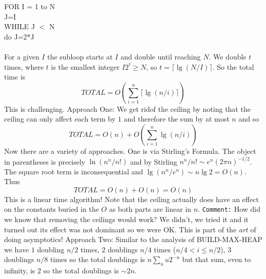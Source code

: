 \documentclass{article}
\begin{document}
\begin{enumerate}
\begin{enumerate}
{{    FOR I = 1 to N
    \\ \hspace*{1cm} J=I
    \\ \hspace*{1cm} WHILE J $<$ N
    \\ \hspace*{2cm} do J=2*J}}
        \\\\ For a given $I$ the subloop starts at $I$ 
		and double until reaching $N$.  We double $t$ times, where $t$ 
		is the smallest integer $I2^t\geq N$, so 
		$t=\lceil \lg(N/I) \rceil$. So the total time is
		\begin{equation}TOTAL = O\left( \sum_{i=1}^n \lceil\lg(n/i)\rceil \right)\end{equation}
		This is challenging.  
		\newline Approach One: We get ridof the ceiling by noting that 
		the ceiling can only affect each term by $1$ and therefore 
		the sum by at most $n$ and so 
		\begin{equation}TOTAL = O(n)+O\left( \sum_{i=1}^n \lg(n/i) \right)\end{equation}
		Now there are a variety of approaches. One is via Stirling's 
		Formula. The object in parentheses is precisely $\ln(n^n/n!)$ 
		and by Stirling $n^n/n! \sim e^n(2\pi n)^{-1/2}$.
		The square root term is inconsequential and 
		$\lg(n^n/e^n) \sim n\lg 2 = O(n)$. Thus 
		\begin{equation}TOTAL = O(n) + O(n ) = O(n)\end{equation}
		This is a linear time algorithm!  Note that the ceiling 
		actually does have an effect on the constants buried in 
		the $O$ as both parts are linear in $n$.
		{\tt Comment:} How did we know that removing the ceilings 
		would work? We didn't, we tried it and it turned out its 
		effect was not dominant so we were OK. This is part of 
		the {\em art} of doing asymptotics!
		\newline Approach Two: Similar to the analysis of 
		BUILD-MAX-HEAP we have $1$ doubling $n/2$ times, 
		$2$ doublings $n/4$ times ($n/4 < i \leq n/2$), 
		$3$ doublings $n/8$ times so the total doublings is 
		$n \sum_u u2^{-u}$ but that sum, even to infinity, is $2$
		so the total doublings is $\sim 2n$.
    \end{enumerate}
    

\end{enumerate}
\end{document}
